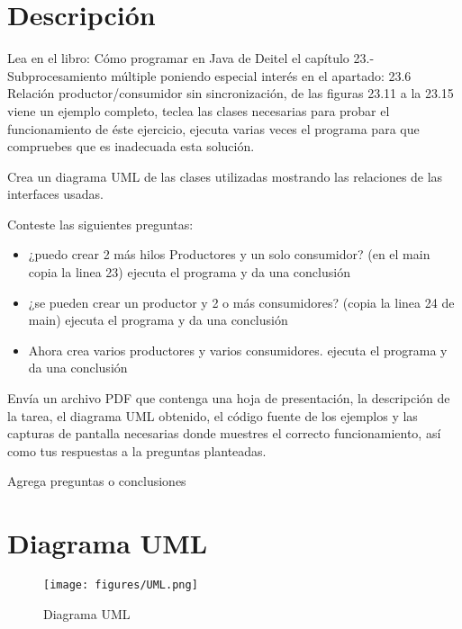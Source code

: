 \documentclass[12pt]{article}
\author{Pablo Vargas Bermúdez}
\begin{document}
\pagestyle{empty}



\section*{Descripción}

Lea en el libro: Cómo programar en Java de Deitel el capítulo 23.-
Subprocesamiento múltiple poniendo especial interés en el apartado:
23.6 Relación productor/consumidor sin sincronización, de las figuras
23.11 a la 23.15 viene un ejemplo completo, teclea las clases
necesarias para probar el funcionamiento de éste ejercicio, ejecuta
varias veces el programa para que compruebes que es inadecuada esta
solución.

Crea un diagrama UML de las clases utilizadas mostrando las relaciones
de las interfaces usadas.

Conteste las siguientes preguntas:

\begin{itemize}
\item ¿puedo crear 2 más hilos Productores y un solo consumidor? (en
  el main copia la linea 23) ejecuta el programa y da una conclusión
\item ¿se pueden crear un productor y 2 o más consumidores? (copia la
  linea 24 de main) ejecuta el programa y da una conclusión
\item Ahora crea varios productores y varios consumidores. ejecuta el
  programa y da una conclusión
\end{itemize}


Envía un archivo PDF que contenga una hoja de presentación, la
descripción de la tarea, el diagrama UML obtenido, el código fuente de
los ejemplos y las capturas de pantalla necesarias donde muestres el
correcto funcionamiento, así como tus respuestas a la preguntas
planteadas.

Agrega preguntas o conclusiones

\section*{Diagrama UML}

\begin{figure}[H]
  \centering
  \texttt{[image: figures/UML.png]}
  \caption{Diagrama UML}
\end{figure}

\begin{center}
\end{center}
\end{document}
